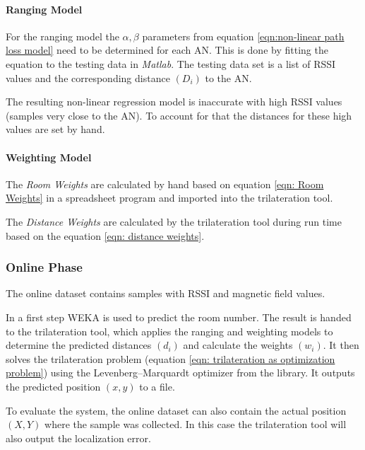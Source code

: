 \paragraph{Ranging Model}
For the ranging model the \(\alpha, \beta\) parameters from equation \ref{eqn:non-linear path loss model} need to be determined for each AN. This is done by fitting the equation to the testing data in \emph{Matlab}. The testing data set is a list of RSSI values and the corresponding distance \((D_{i})\) to the AN.

The resulting non-linear regression model is inaccurate with high RSSI values (samples very close to the AN). To account for that the distances for these high values are set by hand.

\paragraph{Weighting Model}

The \emph{Room Weights} are calculated by hand based on equation \ref{eqn: Room Weights} in a spreadsheet program and imported into the trilateration tool.

The \emph{Distance Weights} are calculated by the trilateration tool during run time based on the equation \ref{eqn: distance weights}.

\subsubsection{Online Phase}

The online dataset contains samples with RSSI and magnetic field values.

In a first step WEKA is used to predict the room number. The result is handed to the trilateration tool, which applies the ranging and weighting models to determine the predicted distances \((d_{i})\) and calculate the weights \((w_{i})\). It then solves the trilateration problem (equation \ref{eqn: trilateration as optimization problem}) using the Levenberg–Marquardt optimizer from the  library. It outputs the predicted position \((x,y)\) to a  file.

To evaluate the system, the online dataset can also contain the actual position \((X,Y)\) where the sample was collected. In this case the trilateration tool will also output the localization error.
